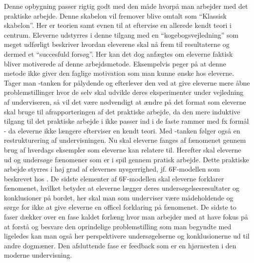 Denne opbygning passer rigtig godt med den måde hvorpå man arbejder med det praktiske arbejde. Denne skabelon vil fremover blive omtalt som ``Klassisk skabelon''. Her er teorien samt evnen til at eftervise en allerede kendt teori i centrum. Eleverne udstyrres i denne tilgang med en ``kogebogsvejledning'' som meget udførligt beskriver hvordan eleverene skal nå frem til resultaterne og dermed et ``succesfuld forsøg''. Her kan det dog anfægtes om eleverne faktisk bliver motiverede af denne arbejdsmetode. Eksempelvis peger \citep{Dolin2014} på at denne metode ikke giver den faglige motivation som man kunne ønske hos eleverne. Tager man \ib-tanken for pålydende og efterlever den ved at give eleverne mere åbne problemstillinger hvor de selv skal udvikle deres eksperimenter under vejledning af underviseren, så vil det være nødvendigt at ændre på det format som eleverne skal bruge til afrapporteringen af det praktiske arbejde, da den mere induktive tilgang til det praktiske arbejde i \ib{} ikke passer ind i de faste rammer med fx formål - da eleverne ikke længere efterviser en kendt teori. Med \ib-tanken følger også en restrukturering af undervisningen. Nu skal eleverne fanges af fænomenet gennem brug af hverdags eksempler som eleverne kan relatere til. Herefter skal eleverne ud og undersøge fænomener som er i spil gennem pratisk arbejde. Dette praktiske arbejde styrres i høj grad af elevernes nysgerrighed,  jf. 6F-modellen som beskrevet hos \citet{Dolin2014}. De sidste elementer af 6F-modellen skal eleverne forklarer fænomenet, hvilket betyder at eleverne lægger deres undersøgelsesresultater og konklusioner på bordet, her skal man som underviser være mådeholdende og sørge for ikke at give eleverne en officel forklaring på fænomenet. De sidste to faser dækker over en fase kaldet forlæng hvor man arbejder med at have fokus på at forstå og besvare den oprindelige problemstilling som man begyndte med ligeledes kan man også her perspektivere undersøgelserne og konklusionerne ud til andre dogmæner. Den afsluttende fase er feedback som er en hjørnesten i den moderne undervisning. 

